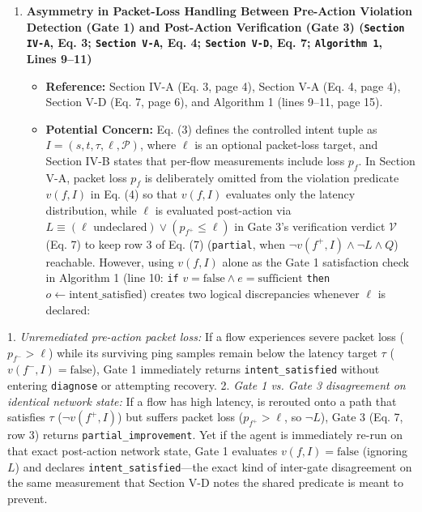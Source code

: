\documentclass[11pt,a4paper]{article}
\begin{document}
\begin{enumerate}[leftmargin=1.6em,itemsep=3pt]
\item \textbf{Asymmetry in Packet-Loss Handling Between Pre-Action Violation Detection (Gate 1) and Post-Action Verification (Gate 3) (\texttt{Section IV-A}, Eq. 3; \texttt{Section V-A}, Eq. 4; \texttt{Section V-D}, Eq. 7; \texttt{Algorithm 1}, Lines 9–11)}
\begin{itemize}[leftmargin=1.8em,itemsep=2pt]
\item \textbf{Reference:} Section IV-A (Eq. 3, page 4), Section V-A (Eq. 4, page 4), Section V-D (Eq. 7, page 6), and Algorithm 1 (lines 9–11, page 15).
\item \textbf{Potential Concern:} Eq. (3) defines the controlled intent tuple as $I = (s, t, \tau, \ell, \mathcal{P})$, where $\ell$ is an optional packet-loss target, and Section IV-B states that per-flow measurements include loss $p_f$. In Section V-A, packet loss $p_f$ is deliberately omitted from the violation predicate $v(f, I)$ in Eq. (4) so that $v(f, I)$ evaluates only the latency distribution, while $\ell$ is evaluated post-action via $L \equiv (\ell \text{ undeclared}) \lor (p_{f^+} \le \ell)$ in Gate 3's verification verdict $\mathcal{V}$ (Eq. 7) to keep row 3 of Eq. (7) (\texttt{partial}, when $\neg v(f^+, I) \land \neg L \land Q$) reachable. However, using $v(f, I)$ alone as the Gate 1 satisfaction check in Algorithm 1 (line 10: \texttt{if} $v = \text{false} \land e = \text{sufficient}$ \texttt{then} $o \leftarrow \text{intent\_satisfied}$) creates two logical discrepancies whenever $\ell$ is declared:
\end{itemize}
\end{enumerate}
1. \emph{Unremediated pre-action packet loss:} If a flow experiences severe packet loss ($p_{f^-} > \ell$) while its surviving ping samples remain below the latency target $\tau$ ($v(f^-, I) = \text{false}$), Gate 1 immediately returns \texttt{intent\_satisfied} without entering \texttt{diagnose} or attempting recovery.
2. \emph{Gate 1 vs. Gate 3 disagreement on identical network state:} If a flow has high latency, is rerouted onto a path that satisfies $\tau$ ($\neg v(f^+, I)$) but suffers packet loss ($p_{f^+} > \ell$, so $\neg L$), Gate 3 (Eq. 7, row 3) returns \texttt{partial\_improvement}. Yet if the agent is immediately re-run on that exact post-action network state, Gate 1 evaluates $v(f, I) = \text{false}$ (ignoring $L$) and declares \texttt{intent\_satisfied}—the exact kind of inter-gate disagreement on the same measurement that Section V-D notes the shared predicate is meant to prevent.
\end{document}
